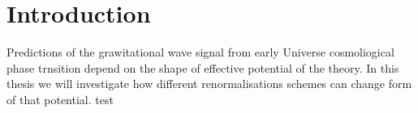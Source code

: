 \chapter{Introduction}
Predictions of the grawitational wave signal from early Universe cosmoliogical phase trnsition 
depend on the shape of effective potential of the theory. 
In this thesis we will investigate how different renormalisations schemes can change 
form of that potential.
test



